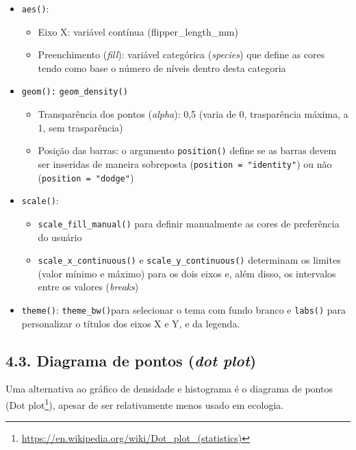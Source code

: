 \documentclass[
]{book}
\renewcommand{\href}[2]{#2\footnote{\url{#1}}}
\begin{document}
\begin{itemize}
\item
  \texttt{aes()}:

  \begin{itemize}
  \item
    Eixo X: variável contínua (flipper\_length\_mm)
  \item
    Preenchimento (\emph{fill}): variável categórica (\emph{species}) que define as cores tendo como base o número de níveis dentro desta categoria
  \end{itemize}
\item
  \texttt{geom():} \texttt{geom\_density()}

  \begin{itemize}
  \item
    Transparência dos pontos (\emph{alpha}): 0,5 (varia de 0, trasparência máxima, a 1, sem trasparência)
  \item
    Posição das barras: o argumento \texttt{position()} define se as barras devem ser inseridas de maneira sobreposta (\texttt{position\ =\ "identity"}) ou não (\texttt{position\ =\ "dodge"})
  \end{itemize}
\item
  \texttt{scale()}:

  \begin{itemize}
  \item
    \texttt{scale\_fill\_manual()} para definir manualmente as cores de preferência do usuário
  \item
    \texttt{scale\_x\_continuous()} e \texttt{scale\_y\_continuous()} determinam os limites (valor mínimo e máximo) para os dois eixos e, além disso, os intervalos entre os valores (\emph{breaks})
  \end{itemize}
\item
  \texttt{theme()}: \texttt{theme\_bw()}para selecionar o tema com fundo branco e \texttt{labs()} para personalizar o títulos dos eixos X e Y, e da legenda.
\end{itemize}

\hypertarget{dot}{%
\subsection{\texorpdfstring{4.3. Diagrama de pontos (\emph{dot plot})}{4.3. Diagrama de pontos (dot plot)}}\label{dot}}

Uma alternativa ao gráfico de densidade e histograma é o diagrama de pontos (\href{https://en.wikipedia.org/wiki/Dot_plot_(statistics)}{Dot plot}), apesar de ser relativamente menos usado em ecologia.
\end{document}
